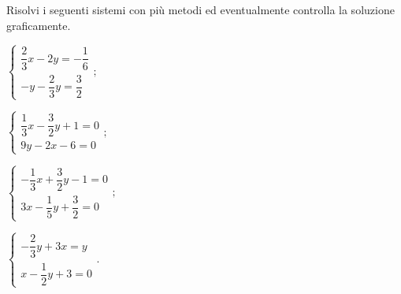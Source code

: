 \begin{esercizio}[\Ast]
 \label{ese:19.72}
 Risolvi i seguenti sistemi con più metodi ed eventualmente controlla
la soluzione graficamente.
\begin{multicols}{2}
\begin{enumeratea}
{\longarray
\item $\left\{\begin{array}{l}\dfrac{2}{3}x-2y=-{\dfrac{1}{6}}\\-y-\dfrac{2}{3}y=\dfrac{3}{2} \end{array}\right.;$
\item $\left\{\begin{array}{l}\dfrac{1}{3}x-\dfrac{3}{2}y+1=0\\9y-2x-6=0 \end{array}\right.;$
\item $\left\{\begin{array}{l}-{\dfrac{1}{3}}x+\dfrac{3}{2}y-1=0\\3x-\dfrac{1}{5}y+\dfrac{3}{2}=0 \end{array}\right.;$
\item $\left\{\begin{array}{l}-{\dfrac{2}{3}}y+3x=y\\x-\dfrac{1}{2}y+3=0 \end{array}\right..$}
\end{enumeratea}
\end{multicols}
\end{esercizio}

